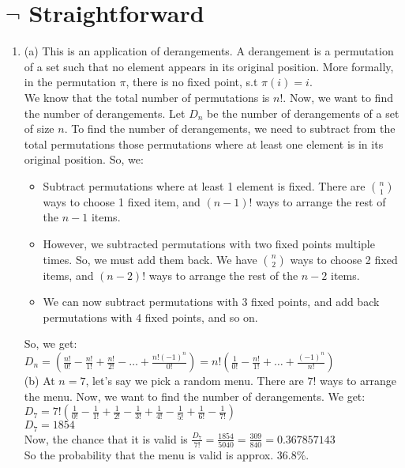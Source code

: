 \documentclass[a4paper]{article}
\begin{document}
\section{$\neg$ Straightforward}
\begin{enumerate}
\item (a) This is an application of derangements. A derangement is a permutation of a set such that no element appears in its original position. More formally, in the permutation $\pi$, there is no fixed point, s.t $\pi (i) = i$.\\

We know that the total number of permutations is $n!$. Now, we want to find the number of derangements. Let $D_n$ be the number of derangements of a set of size $n$. To find the number of derangements, we need to subtract from the total permutations those permutations where at least one element is in its original position. So, we:
\begin{itemize}
    \item Subtract permutations where at least 1 element is fixed. There are $n\choose 1$ ways to choose 1 fixed item, and $(n-1)!$ ways to arrange the rest of the $n-1$ items.
    \item However, we subtracted permutations with two fixed points multiple times. So, we must add them back. We have $n\choose 2$ ways to choose 2 fixed items, and $(n-2)!$ ways to arrange the rest of the $n-2$ items.
    \item We can now subtract permutations with 3 fixed points, and add back permutations with 4 fixed points, and so on.
\end{itemize}

So, we get:\\
$D_n = (\frac{n!}{0!} - \frac{n!}{1!} + \frac{n!}{2!} - \ldots  + \frac{n! (-1)^n}{0!}) = n!(\frac{1}{0!} -\frac{n!}{1!} + \ldots + \frac{(-1)^n}{n!})$\\

(b) At $n=7$, let's say we pick a random menu. There are $7!$ ways to arrange the menu. Now, we want to find the number of derangements. We get:\\
$D_7 = 7!(\frac{1}{0!} -\frac{1}{1!} + \frac{1}{2!} - \frac{1}{3!} + \frac{1}{4!} - \frac{1}{5!} + \frac{1}{6!} - \frac{1}{7!})$\\
$D_7 = 1854$\\

Now, the chance that it is valid is $\frac{D_7}{7!} = \frac{1854}{5040} = \frac{309}{840} = 0.367857143$\\
So the probability that the menu is valid is approx. $36.8\%$.


\end{enumerate}
\end{document}

